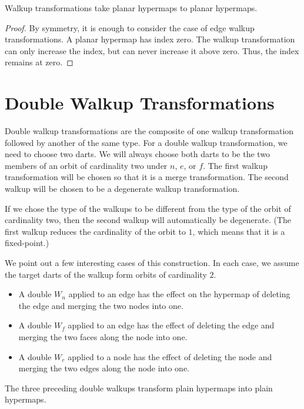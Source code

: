 \begin{lemma} Walkup transformations take planar hypermaps to planar
hypermaps.
\end{lemma}

\begin{proof}  By symmetry, it is enough to consider the case of edge walkup
transformations.  A planar hypermap has index zero.  The walkup
transformation can only increase the index, but can never increase
it above zero.  Thus, the index remains at zero.
\end{proof}


\section{Double Walkup Transformations}

Double walkup transformations are the composite of one walkup
transformation followed by another of the same type.  For a double
walkup transformation, we need to choose two darts.  We will always
choose both darts to be the two members of an orbit of cardinality
two under $n$, $e$, or $f$.  The first walkup transformation will be
chosen so that it is a merge transformation.  The second walkup will
be chosen to be a degenerate walkup transformation.

If we chose the type of the walkups to be different from the type of
the orbit of cardinality two, then the second walkup will
automatically be degenerate.  (The first walkup reduces the
cardinality of the orbit to $1$, which means that it is a
fixed-point.)

We point out a few interesting cases of this construction. In each
case, we assume the target darts of the walkup form orbits of
cardinality $2$.
\begin{itemize}
    \item A double $W_n$ applied to an edge has the effect on
    the hypermap of deleting the edge and merging the two nodes into
    one.
    \item A double $W_f$ applied to an edge has the effect of
    deleting the edge and merging the two faces along the node into
    one.
    \item A double $W_e$ applied to a node has the effect of
    deleting the node and merging the two edges along the node into
    one.
\end{itemize}

\begin{lemma}  The three preceding double walkups transform plain
hypermaps into plain hypermaps.
\end{lemma}


